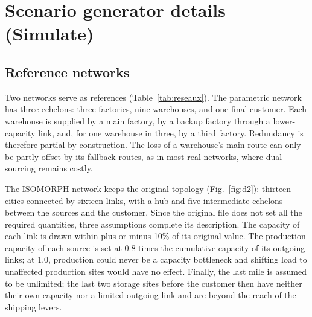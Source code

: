 \section{Scenario generator details (Simulate)}
\label{sec:S3}

\subsection{Reference networks}
\label{sec:S3.1}

Two networks serve as references (Table~\ref{tab:reseaux}). The parametric network has three echelons: three factories, nine warehouses, and one final customer. Each warehouse is supplied by a main factory, by a backup factory through a lower-capacity link, and, for one warehouse in three, by a third factory. Redundancy is therefore partial by construction. The loss of a warehouse's main route can only be partly offset by its fallback routes, as in most real networks, where dual sourcing remains costly.

The ISOMORPH network keeps the original topology (Fig.~\ref{fig:d2}): thirteen cities connected by sixteen links, with a hub and five intermediate echelons between the sources and the customer. Since the original file does not set all the required quantities, three assumptions complete its description. The capacity of each link is drawn within plus or minus 10\% of its original value. The production capacity of each source is set at 0.8 times the cumulative capacity of its outgoing links; at 1.0, production could never be a capacity bottleneck and shifting load to unaffected production sites would have no effect. Finally, the last mile is assumed to be unlimited; the last two storage sites before the customer then have neither their own capacity nor a limited outgoing link and are beyond the reach of the shipping levers.

\begin{center}

\label{fig:d2}
\end{center}

